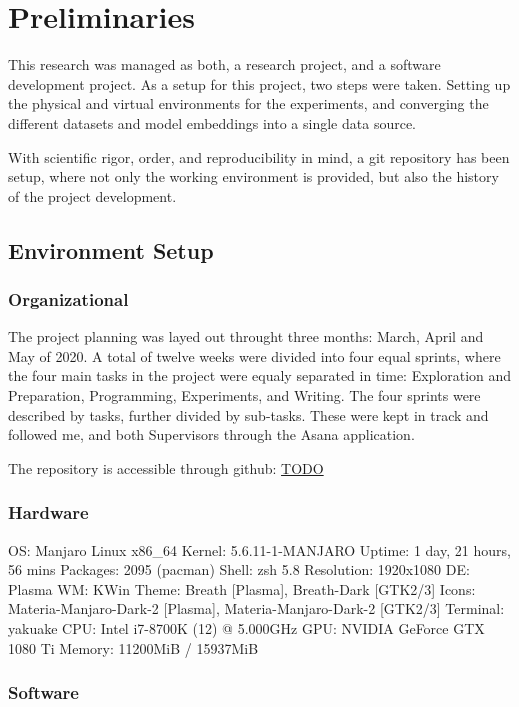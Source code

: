 \section{Preliminaries}\label{sec:Preliminaries}
This research was managed as both, a research project, and a software development project.
As a setup for this project, two steps were taken. Setting up the physical and virtual environments for the experiments, and converging the different datasets and model embeddings into a single data source.

With scientific rigor, order, and reproducibility in mind, a git repository has been setup, where not only the working environment is provided, but also the history of the project  development.


\subsection{Environment Setup}\label{sub:Environment Setup}
\subsubsection{Organizational}\label{subs:Organizational}
The project planning was layed out throught three months: March, April and May of 2020. A total of twelve weeks were divided into four equal sprints, where the four main tasks in the project were equaly separated in time: Exploration and Preparation, Programming, Experiments, and Writing. The four sprints were described by tasks, further divided by sub-tasks. These were kept in track and followed me, and both Supervisors through the Asana application\cite{TODO}.

The repository is accessible through github: \url{TODO}

\subsubsection{Hardware}\label{subs:Hardware}
OS: Manjaro Linux x86_64
Kernel: 5.6.11-1-MANJARO
Uptime: 1 day, 21 hours, 56 mins
Packages: 2095 (pacman)
Shell: zsh 5.8
Resolution: 1920x1080 
DE: Plasma
WM: KWin
Theme: Breath [Plasma], Breath-Dark [GTK2/3]
Icons: Materia-Manjaro-Dark-2 [Plasma], Materia-Manjaro-Dark-2 [GTK2/3]
Terminal: yakuake
CPU: Intel i7-8700K (12) @ 5.000GHz
GPU: NVIDIA GeForce GTX 1080 Ti
Memory: 11200MiB / 15937MiB


\subsubsection{Software}\label{subs:Software}
